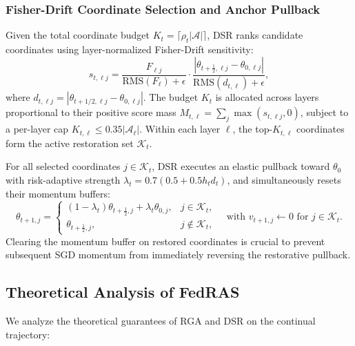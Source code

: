 \documentclass[journal]{IEEEtran}
\begin{document}
\subsubsection{Fisher-Drift Coordinate Selection and Anchor Pullback}
Given the total coordinate budget $K_t = \lceil \rho_t |\mathcal{A}| \rceil$, DSR ranks candidate coordinates using layer-normalized Fisher-Drift sensitivity:
\begin{equation}
\label{eq:fisher_drift}
s_{t, \ell j} = \frac{F_{\ell j}}{\mathrm{RMS}(F_\ell) + \epsilon} \cdot \frac{|\theta_{t+\frac{1}{2}, \ell j} - \theta_{0, \ell j}|}{\mathrm{RMS}(d_{t, \ell}) + \epsilon},
\end{equation}
where $d_{t, \ell j} = |\theta_{t+1/2, \ell j} - \theta_{0, \ell j}|$. The budget $K_t$ is allocated across layers proportional to their positive score mass $M_{t, \ell} = \sum_j \max(s_{t, \ell j}, 0)$, subject to a per-layer cap $K_{t, \ell} \le 0.35 |\mathcal{A}_\ell|$. Within each layer $\ell$, the top-$K_{t, \ell}$ coordinates form the active restoration set $\mathcal{K}_t$.

For all selected coordinates $j \in \mathcal{K}_t$, DSR executes an elastic pullback toward $\theta_0$ with risk-adaptive strength $\lambda_t = 0.7(0.5 + 0.5 h_t d_t)$, and simultaneously resets their momentum buffers:
\begin{equation}
\label{eq:anchor_pullback}
\theta_{t+1, j} = \begin{cases} (1 - \lambda_t)\theta_{t+\frac{1}{2}, j} + \lambda_t \theta_{0, j}, & j \in \mathcal{K}_t, \\ \theta_{t+\frac{1}{2}, j}, & j \notin \mathcal{K}_t, \end{cases} \quad \text{with } v_{t+1, j} \leftarrow 0 \text{ for } j \in \mathcal{K}_t.
\end{equation}
Clearing the momentum buffer on restored coordinates is crucial to prevent subsequent SGD momentum from immediately reversing the restorative pullback.

\subsection{Theoretical Analysis of FedRAS}
We analyze the theoretical guarantees of RGA and DSR on the continual trajectory:
\end{document}
